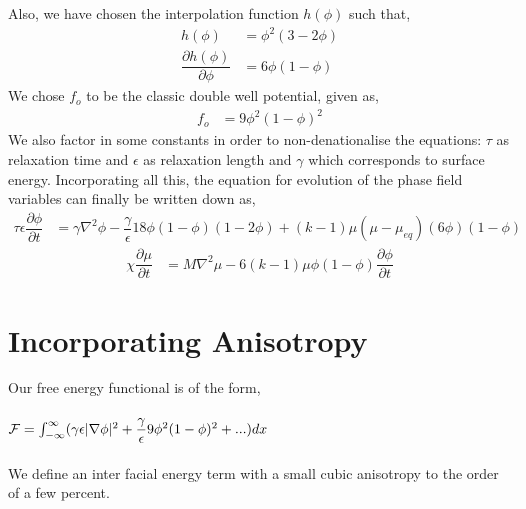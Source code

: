 \documentclass[a4paper]{report}
\begin{document}
Also, we have chosen the interpolation function $h(\phi)$ such that,
\begin{align}
	h(\phi) &= \phi^2\left(3 - 2 \phi\right) \\
	\dfrac{\partial h(\phi)}{\partial \phi} &= 6\phi\left(1-\phi\right)
	\label{interpolation functions}
\end{align}
We chose $f_o$ to be the classic double well potential, given as,
\begin{align}
	f_o &= 9\phi^2\left(1-\phi\right)^2
\end{align}
We also factor in some constants in order to non-denationalise the equations: $\tau$ as relaxation
time and $\epsilon$ as relaxation length and $\gamma$ which corresponds to surface energy.
Incorporating all this, the equation for evolution of the phase field variables 
can finally be written down as,
\begin{align}
\tau\epsilon\dfrac{\partial\phi}{\partial t} &= \gamma\nabla^{2}\phi -\dfrac{\gamma}{\epsilon}18\phi(1-\phi)(1-2\phi)
					+(k - 1)\mu\left(\mu-\mu_{eq}\right)(6\phi)\left(1-\phi\right)
\label{phi_evolution}
\end{align}
\begin{align}
		\chi \dfrac{\partial \mu}{\partial t} &=  M\nabla^2\mu 
	- 6\left(k-1\right)\mu\phi\left(1-\phi\right)\dfrac{\partial\phi}{\partial t}
\label{mu_evolution}
\end{align}
\section{Incorporating Anisotropy}
Our free energy functional is of the form,\\
 \\
${\cal F} = \int_{-\infty}^{\infty}(\gamma\epsilon|\nabla\phi|^2 + \dfrac{\gamma}{\epsilon}9\phi^2(1-\phi)^2 + ...)dx$\\
 \\
We define an inter facial energy term with a small cubic anisotropy 
to the order of a few percent.\\
\end{document}
